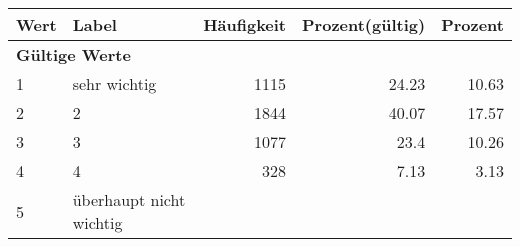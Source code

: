      \begin{longtable}{lXrrr}
     \toprule
     \textbf{Wert} & \textbf{Label} & \textbf{Häufigkeit} & \textbf{Prozent(gültig)} & \textbf{Prozent} \\
     \endhead
     \midrule
     \multicolumn{5}{l}{\textbf{Gültige Werte}}\\

     1 &
     \multicolumn{1}{X}{ sehr wichtig   } &


       \num{1115} &
       \num[round-mode=places,round-precision=2]{24,23} &
         \num[round-mode=places,round-precision=2]{10,63} \\

     2 &
     \multicolumn{1}{X}{ 2   } &


       \num{1844} &
       \num[round-mode=places,round-precision=2]{40,07} &
         \num[round-mode=places,round-precision=2]{17,57} \\

     3 &
     \multicolumn{1}{X}{ 3   } &


       \num{1077} &
       \num[round-mode=places,round-precision=2]{23,4} &
         \num[round-mode=places,round-precision=2]{10,26} \\

     4 &
     \multicolumn{1}{X}{ 4   } &


       \num{328} &
       \num[round-mode=places,round-precision=2]{7,13} &
         \num[round-mode=places,round-precision=2]{3,13} \\

     5 &
     \multicolumn{1}{X}{ überhaupt nicht wichtig   } &



\end{longtable}
